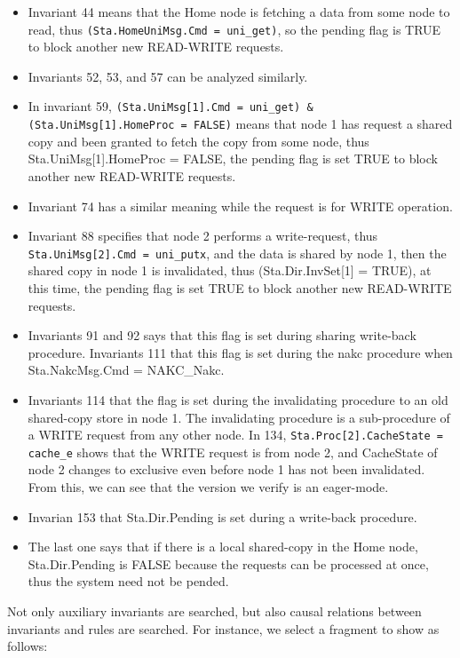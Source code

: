 \documentclass{llncs}
\begin{document}
\begin{itemize}
 \item Invariant 44 means that the Home node is fetching a data from some node to read, thus {\tt (Sta.HomeUniMsg.Cmd = uni\_get)}, so the pending flag is  TRUE to block another new READ-WRITE requests.
 \item Invariants 52, 53, and 57 can be analyzed similarly.
 \item In invariant 59, {\tt (Sta.UniMsg[1].Cmd = uni\_get) \& (Sta.UniMsg[1].HomeProc = FALSE)} means that node 1 has request a shared copy and been granted to fetch the copy from some node, thus Sta.UniMsg[1].HomeProc = FALSE, the pending flag is set TRUE to block another new READ-WRITE requests.
  \item    Invariant 74 has a similar meaning while the request is for WRITE operation.

  \item    Invariant 88 specifies that node 2 performs a write-request, thus {\tt Sta.UniMsg[2].Cmd = uni\_putx}, and the data is shared by node 1, then the shared copy in node 1 is invalidated, thus (Sta.Dir.InvSet[1] = TRUE), at this time,  the pending flag is set TRUE to block another new READ-WRITE requests.

  \item   Invariants 91 and 92 says that this flag is set during sharing write-back procedure. Invariants 111  that this flag is set during the nakc procedure when  Sta.NakcMsg.Cmd = NAKC\_Nakc.

   \item     Invariants 114 that the flag is set during the invalidating procedure to an old shared-copy store in node 1. The invalidating procedure is a sub-procedure  of a WRITE request from any other node. In 134, {\tt Sta.Proc[2].CacheState = cache\_e} shows that the WRITE request is from node 2, and CacheState of node 2 changes to exclusive even before node 1 has not been invalidated. From this, we can see that the version we verify is an eager-mode.

   \item       Invarian 153 that Sta.Dir.Pending is set during a write-back procedure.

  \item  The last one says that if there is a  local shared-copy in the Home node, Sta.Dir.Pending is FALSE because the   requests can be processed at once, thus the system need not be pended.
\end{itemize}
Not only auxiliary invariants are searched, but also causal relations between   invariants and  rules are searched.
For instance, we select a fragment to show as follows:\\
\end{document}
